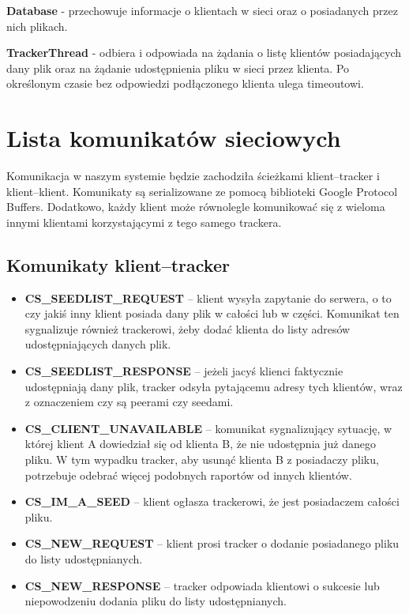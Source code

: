 \documentclass[11pt]{article}
\begin{document}
\textbf{Database} - przechowuje informacje o klientach w sieci oraz o posiadanych przez nich plikach.

\textbf{TrackerThread} - odbiera i odpowiada na żądania o listę klientów posiadających dany plik oraz na żądanie udostępnienia pliku w sieci przez klienta. Po określonym czasie bez odpowiedzi podłączonego klienta ulega timeoutowi.

\section{Lista komunikatów sieciowych}
Komunikacja w naszym systemie będzie zachodziła ścieżkami klient--tracker i klient--klient. Komunikaty są serializowane ze pomocą biblioteki Google Protocol Buffers. Dodatkowo, każdy klient może równolegle komunikować się z wieloma innymi klientami korzystającymi z tego samego trackera.
\subsection{Komunikaty klient--tracker}
\begin{itemize}
\item \textbf{CS\_SEEDLIST\_REQUEST} -- klient wysyła zapytanie do serwera, o to czy jakiś inny klient posiada dany plik w całości lub w części. Komunikat ten sygnalizuje również trackerowi, żeby dodać klienta do listy adresów udostępniających danych plik.
\item \textbf{CS\_SEEDLIST\_RESPONSE} -- jeżeli jacyś klienci faktycznie udostępniają dany plik, tracker odsyła pytającemu adresy tych klientów, wraz z oznaczeniem czy są peerami czy seedami.
\item \textbf{CS\_CLIENT\_UNAVAILABLE} -- komunikat sygnalizujący sytuację, w której klient A dowiedział się od klienta B, że nie udostępnia już danego pliku. W tym wypadku tracker, aby usunąć klienta B z posiadaczy pliku, potrzebuje odebrać więcej podobnych raportów od innych klientów.
\item \textbf{CS\_IM\_A\_SEED} -- klient ogłasza trackerowi, że jest posiadaczem całości pliku.
\item \textbf{CS\_NEW\_REQUEST} -- klient prosi tracker o dodanie posiadanego pliku do listy udostępnianych.
\item \textbf{CS\_NEW\_RESPONSE} -- tracker odpowiada klientowi o sukcesie lub niepowodzeniu dodania pliku do listy udostępnianych.
\end{itemize}
\end{document}
